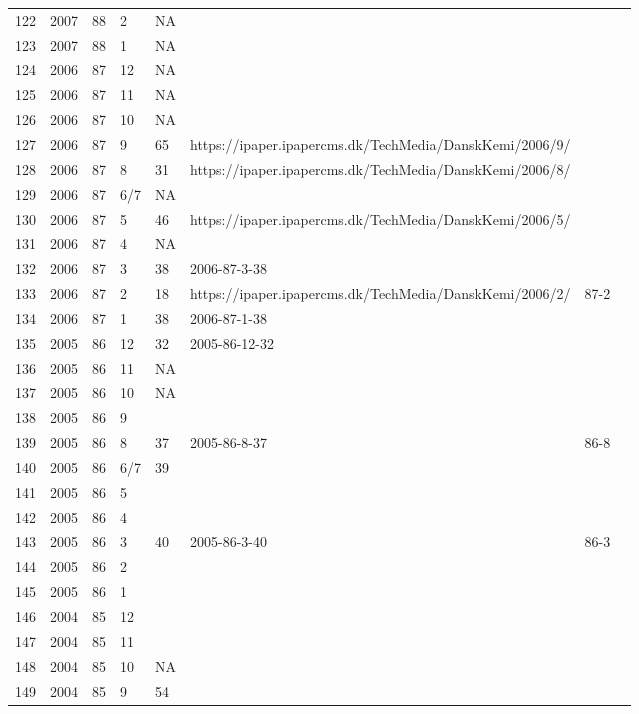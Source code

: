 \begin{longtable}{ |l|l|l|l|l|l|l|l| }
122 & 2007 & 88 &     2 &      NA &  &  & \\
123 & 2007 & 88 &     1 &      NA &  &  & \\
124 & 2006 & 87 &    12 &      NA &  &  & \\
125 & 2006 & 87 &    11 &      NA &  &  & \\
126 & 2006 & 87 &    10 &      NA &  &  & \\
127 & 2006 & 87 &     9 &      65 & https://ipaper.ipapercms.dk/TechMedia/DanskKemi/2006/9/ &  & \\
128 & 2006 & 87 &     8 &      31 & https://ipaper.ipapercms.dk/TechMedia/DanskKemi/2006/8/ &  & \\
129 & 2006 & 87 &   6/7 &      NA &  &  & \\
130 & 2006 & 87 &     5 &      46 & https://ipaper.ipapercms.dk/TechMedia/DanskKemi/2006/5/ &  & \\
131 & 2006 & 87 &     4 &      NA &  &  & \\
132 & 2006 & 87 &     3 &      38 & 2006-87-3-38 &  & \\
133 & 2006 & 87 &     2 &      18 & https://ipaper.ipapercms.dk/TechMedia/DanskKemi/2006/2/ & 87-2  & \\
134 & 2006 & 87 &     1 &      38 & 2006-87-1-38 &  & \\
135 & 2005 & 86 &    12 &      32 & 2005-86-12-32 &  & \\
136 & 2005 & 86 &    11 &      NA &  &  & \\
137 & 2005 & 86 &    10 &      NA &  &  & \\
138 & 2005 & 86 &     9 &         &  &  & \\
139 & 2005 & 86 &     8 &      37 & 2005-86-8-37 & 86-8  & \\
140 & 2005 & 86 &   6/7 &      39 &  &  & \\
141 & 2005 & 86 &     5 &         &  &  & \\
142 & 2005 & 86 &     4 &         & &  & \\
143 & 2005 & 86 &     3 &      40 &  2005-86-3-40 & 86-3 & \\
144 & 2005 & 86 &     2 &         &  &  & \\
145 & 2005 & 86 &     1 &         &  &  & \\
146 & 2004 & 85 &    12 &         &  &  & \\
147 & 2004 & 85 &    11 &         &  &  & \\
148 & 2004 & 85 &    10 &      NA &  &  & \\
149 & 2004 & 85 &     9 &      54 &  &  & \\

\end{longtable}
